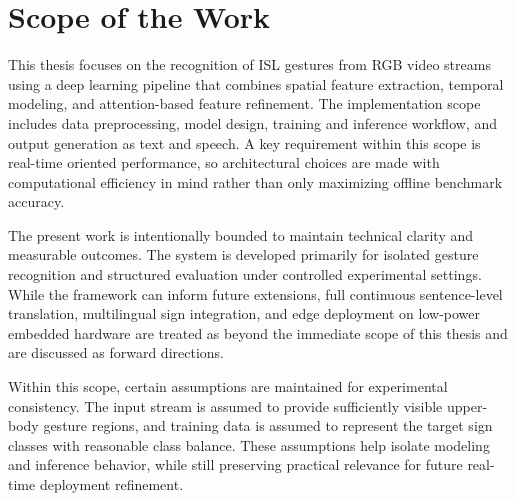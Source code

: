 \section{Scope of the Work}
This thesis focuses on the recognition of ISL gestures from RGB video streams using a deep learning pipeline that combines spatial feature extraction, temporal modeling, and attention-based feature refinement. The implementation scope includes data preprocessing, model design, training and inference workflow, and output generation as text and speech. A key requirement within this scope is real-time oriented performance, so architectural choices are made with computational efficiency in mind rather than only maximizing offline benchmark accuracy.

The present work is intentionally bounded to maintain technical clarity and measurable outcomes. The system is developed primarily for isolated gesture recognition and structured evaluation under controlled experimental settings. While the framework can inform future extensions, full continuous sentence-level translation, multilingual sign integration, and edge deployment on low-power embedded hardware are treated as beyond the immediate scope of this thesis and are discussed as forward directions.

Within this scope, certain assumptions are maintained for experimental consistency. The input stream is assumed to provide sufficiently visible upper-body gesture regions, and training data is assumed to represent the target sign classes with reasonable class balance. These assumptions help isolate modeling and inference behavior, while still preserving practical relevance for future real-time deployment refinement.
